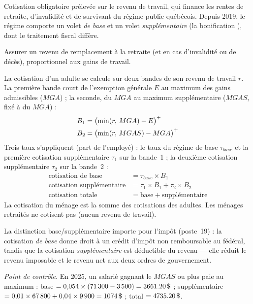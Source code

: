
\pdesc Cotisation obligatoire prélevée sur le revenu de travail, qui finance
les rentes de retraite, d'invalidité et de survivant du régime public
québécois. Depuis 2019, le régime comporte un volet \emph{de base} et un
volet \emph{supplémentaire} (la \og bonification \fg{}), dont le traitement
fiscal diffère.

\pobj Assurer un revenu de remplacement à la retraite (et en cas
d'invalidité ou de décès), proportionnel aux gains de travail.

\pregle La cotisation d'un adulte se calcule sur deux bandes de son revenu de
travail $r$. La première bande court de l'exemption générale $E$ au maximum
des gains admissibles ($MGA$) ; la seconde, du $MGA$ au maximum
supplémentaire ($MGAS$, fixé à  du $MGA$) :
\begin{align*}
B_1 &= \bigl(\min(r,\, MGA) - E\bigr)^{+} \\
B_2 &= \bigl(\min(r,\, MGAS) - MGA\bigr)^{+}
\end{align*}
Trois taux s'appliquent (part de l'employé) : le taux du régime de base
$\tau_{base}$ et la première cotisation supplémentaire $\tau_1$ sur la
bande~1 ; la deuxième cotisation supplémentaire $\tau_2$ sur la bande~2 :
\begin{align*}
\text{cotisation de base} &= \tau_{base} \times B_1 \\
\text{cotisation supplémentaire} &= \tau_1 \times B_1 + \tau_2 \times B_2 \\
\text{cotisation totale} &= \text{base} + \text{supplémentaire}
\end{align*}
La cotisation du ménage est la somme des cotisations des adultes. Les
ménages retraités ne cotisent pas (aucun revenu de travail).

La distinction base/supplémentaire importe pour l'impôt (poste~19) : la
cotisation \emph{de base} donne droit à un crédit d'impôt non remboursable au
fédéral, tandis que la cotisation \emph{supplémentaire} est déductible du
revenu --- elle réduit le revenu imposable et le revenu net aux deux ordres
de gouvernement.

\emph{Point de contrôle.} En 2025, un salarié gagnant le $MGAS$ ou plus paie
au maximum : base $= 0{,}054 \times (71\,300 - 3\,500) = \D{3661.20}$ ;
supplémentaire $= 0{,}01 \times 67\,800 + 0{,}04 \times 9\,900 = \D{1074}$ ;
total $= \D{4735.20}$.

